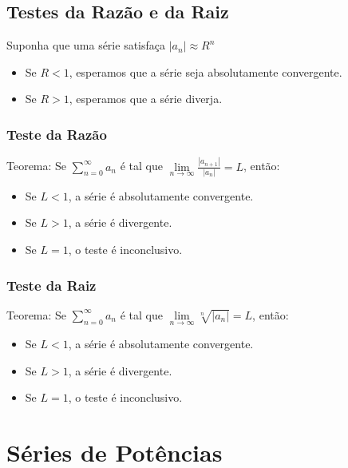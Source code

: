\documentclass{article}
\begin{document}
\subsection{Testes da Raz\~ao e da Raiz}
Suponha que uma s\'erie satisfa\c{c}a $|a_n| \approx R^n$
\begin{itemize}
  \item Se $R < 1$, esperamos que a s\'erie seja absolutamente convergente.
  \item Se $R > 1$, esperamos que a s\'erie diverja.
\end{itemize}

\subsubsection{Teste da Raz\~ao}
Teorema: Se $\sum\limits_{n=0}^\infty a_n$ \'e tal que $\lim\limits_{n\to\infty} \frac{|a_{n + 1}|}{|a_n|} = L$, ent\~ao:
\begin{itemize}
  \item Se $L < 1$, a s\'erie \'e absolutamente convergente.
  \item Se $L > 1$, a s\'erie \'e divergente.
  \item Se $L = 1$, o teste \'e inconclusivo.
\end{itemize}

\subsubsection{Teste da Raiz}
Teorema: Se $\sum\limits_{n=0}^\infty a_n$ \'e tal que $\lim\limits_{n\to\infty} \sqrt[n]{|a_n|} = L$, ent\~ao:
\begin{itemize}
  \item Se $L < 1$, a s\'erie \'e absolutamente convergente.
  \item Se $L > 1$, a s\'erie \'e divergente.
  \item Se $L = 1$, o teste \'e inconclusivo.
\end{itemize}



\section{S\'eries de Pot\^encias}
\end{document}
